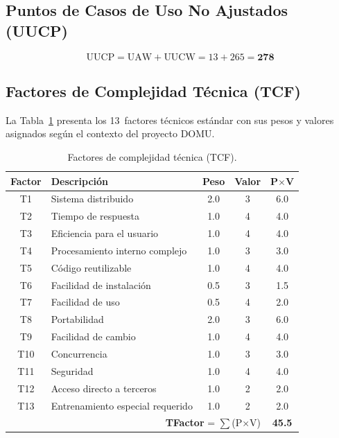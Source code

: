\subsection{Puntos de Casos de Uso No Ajustados (UUCP)}

\[
\text{UUCP} = \text{UAW} + \text{UUCW} = 13 + 265 = \mathbf{278}
\]

\subsection{Factores de Complejidad Técnica (TCF)}

La Tabla~\ref{tab:tcf} presenta los 13~factores técnicos estándar con sus pesos y valores asignados según el contexto del proyecto DOMU.

\begin{table}[H]
\centering
\begin{tabular}{|c|p{}|c|c|c|}
\hline
\textbf{Factor} & \textbf{Descripción} & \textbf{Peso} & \textbf{Valor} & \textbf{P$\times$V} \\
\hline
T1 & Sistema distribuido & 2.0 & 3 & 6.0 \\
\hline
T2 & Tiempo de respuesta & 1.0 & 4 & 4.0 \\
\hline
T3 & Eficiencia para el usuario & 1.0 & 4 & 4.0 \\
\hline
T4 & Procesamiento interno complejo & 1.0 & 3 & 3.0 \\
\hline
T5 & Código reutilizable & 1.0 & 4 & 4.0 \\
\hline
T6 & Facilidad de instalación & 0.5 & 3 & 1.5 \\
\hline
T7 & Facilidad de uso & 0.5 & 4 & 2.0 \\
\hline
T8 & Portabilidad & 2.0 & 3 & 6.0 \\
\hline
T9 & Facilidad de cambio & 1.0 & 4 & 4.0 \\
\hline
T10 & Concurrencia & 1.0 & 3 & 3.0 \\
\hline
T11 & Seguridad & 1.0 & 4 & 4.0 \\
\hline
T12 & Acceso directo a terceros & 1.0 & 2 & 2.0 \\
\hline
T13 & Entrenamiento especial requerido & 1.0 & 2 & 2.0 \\
\hline
\multicolumn{4}{|r|}{\textbf{TFactor} = $\sum$(P$\times$V)} & \textbf{45.5} \\
\hline
\end{tabular}
\caption{Factores de complejidad técnica (TCF).}
\label{tab:tcf}
\end{table}

